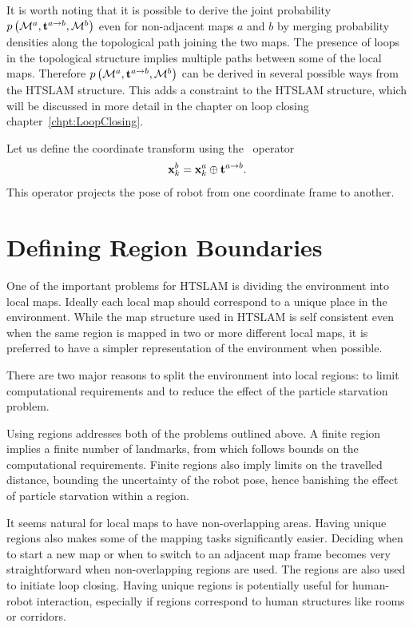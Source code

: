 It is worth noting that it is possible to derive the joint
probability $\prob{\map{}{}{a},\tr{}{a}{b},\map{}{}{b}}$ even for
non-adjacent maps $a$ and $b$ by merging probability densities along
the topological path joining the two maps.  The presence of loops in
the topological structure implies multiple paths between some of the
local maps. Therefore $\prob{\map{}{}{a},\tr{}{a}{b},\map{}{}{b}}$ can
be derived in several possible ways from the HTSLAM structure. This
adds a constraint to the HTSLAM structure, which will be discussed in
more detail in the chapter on loop closing chapter~\ref{chpt:LoopClosing}.

Let us define the coordinate transform using the \transit\ operator
\begin{equation}
\x{k}{}{b} = \x{k}{}{a} \transit \tr{}{a}{b}.
\end{equation}
This operator projects the pose of robot from one coordinate frame to
another.


\section{Defining Region Boundaries}
\label{sec:region}

One of the important problems for HTSLAM is dividing the environment
into local maps. Ideally each local map should correspond to a unique
place in the environment. While the map structure used in HTSLAM is
self consistent even when the same region is mapped in two or more
different local maps, it is preferred to have a simpler representation
of the environment when possible.

There are two major reasons to split the environment into local
regions: to limit computational requirements and to reduce the effect
of the particle starvation problem.

Using regions addresses both of the problems outlined above. A finite
region implies a finite number of landmarks, from which follows bounds
on the computational requirements. Finite regions also imply limits on
the travelled distance, bounding the uncertainty of the robot pose,
hence banishing the effect of particle starvation within a region.

It seems natural for local maps to have non-overlapping areas. Having
unique regions also makes some of the mapping tasks significantly
easier. Deciding when to start a new map or when to switch to an
adjacent map frame becomes very straightforward when non-overlapping
regions are used. The regions are also used to initiate loop
closing. Having unique regions is potentially useful for human-robot
interaction, especially if regions correspond to human structures
like rooms or corridors.

